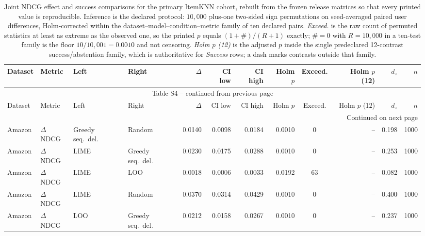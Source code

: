 \begin{longtable}{@{}p{}p{}p{}p{}rrrrcrrr@{}}
\caption{Joint NDCG effect and success comparisons for the primary ItemKNN
cohort, rebuilt from the frozen release matrices so that every printed value is
reproducible. Inference is the declared protocol: $10{,}000$ plus-one two-sided
sign permutations on seed-averaged paired user differences, Holm-corrected
within the dataset--model--condition--metric family of ten declared pairs.
\emph{Exceed.} is the raw count of permuted statistics at least as extreme as
the observed one, so the printed $p$ equals $(1+\#)/(R+1)$ exactly; $\#=0$
with $R=10{,}000$ in a ten-test family is the floor $10/10{,}001=0.0010$ and
not censoring. \emph{Holm $p$ (12)} is the adjusted $p$ inside the single
predeclared 12-contrast success/abstention family, which is authoritative for
\emph{Success} rows; a dash marks contrasts outside that family.}
\label{tab:S4}\\
\toprule
Dataset & Metric & Left & Right & $\Delta$ & CI low & CI high & Holm $p$ & Exceed. & Holm $p$ (12) & $d_z$ & $n$ \\
\midrule
\endfirsthead
\multicolumn{12}{c}{Table S4 -- continued from previous page}\\
\toprule
Dataset & Metric & Left & Right & $\Delta$ & CI low & CI high & Holm $p$ & Exceed. & Holm $p$ (12) & $d_z$ & $n$ \\
\midrule
\endhead
\midrule
\multicolumn{12}{r}{Continued on next page}\\
\endfoot
\bottomrule
\endlastfoot
Amazon & $\Delta$NDCG & Greedy seq.\ del. & Random & 0.0140 & 0.0098 & 0.0184 & 0.0010 & 0 & -- & 0.198 & 1000 \\
Amazon & $\Delta$NDCG & LIME & Greedy seq.\ del. & 0.0230 & 0.0175 & 0.0288 & 0.0010 & 0 & -- & 0.253 & 1000 \\
Amazon & $\Delta$NDCG & LIME & LOO & 0.0018 & 0.0006 & 0.0033 & 0.0192 & 63 & -- & 0.082 & 1000 \\
Amazon & $\Delta$NDCG & LIME & Random & 0.0370 & 0.0314 & 0.0429 & 0.0010 & 0 & -- & 0.400 & 1000 \\
Amazon & $\Delta$NDCG & LOO & Greedy seq.\ del. & 0.0212 & 0.0158 & 0.0267 & 0.0010 & 0 & -- & 0.237 & 1000 \\

\end{longtable}
